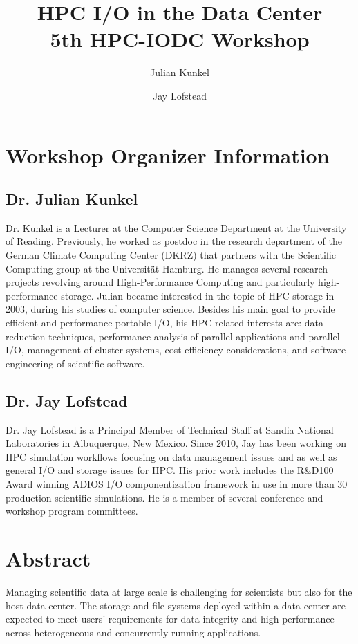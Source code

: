 \documentclass[a4paper,10pt]{article}
\title{HPC I/O in the Data Center\\ {\normalsize 5th HPC-IODC Workshop}}
\author{Julian Kunkel \and Jay Lofstead}
\begin{document}
\maketitle

\section{Workshop Organizer Information}

\subsection{Dr. Julian Kunkel}

Dr. Kunkel is a Lecturer at the Computer Science Department at the University of Reading. Previously, he worked as postdoc in the research department of the German Climate Computing Center (DKRZ) that partners with the Scientific Computing group at the Universität Hamburg.
He manages several research projects revolving around High-Performance Computing and particularly high-performance storage. Julian became interested in the topic of HPC storage in 2003, during his studies of computer science. Besides his main goal to provide efficient and performance-portable I/O, his HPC-related interests are: data reduction techniques, performance analysis of parallel applications and parallel I/O, management of cluster systems, cost-efficiency considerations, and software engineering of scientific software.

\subsection{Dr. Jay Lofstead}

Dr. Jay Lofstead is a Principal Member of Technical Staff at Sandia National
Laboratories in Albuquerque, New Mexico. Since 2010, Jay has been working on
HPC simulation workflows focusing on data management issues and as well as
general I/O and storage issues for HPC.  His prior work includes the R\&D100
Award winning ADIOS I/O componentization framework in use in more than 30
production scientific simulations. He is a member of several conference and
workshop program committees.

\section{Abstract}
Managing scientific data at large scale is challenging for scientists but also for the host data center.
The storage and file systems deployed within a data center are expected to meet users' requirements for data integrity and high performance across heterogeneous and concurrently running applications.
\end{document}
